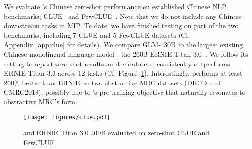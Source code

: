 We evaluate \glm's Chinese zero-shot performance on established Chinese NLP benchmarks, CLUE~\citep{xu2020clue} and FewCLUE~\citep{xu2021fewclue}.%
Note that we do not include any Chinese downstream tasks in MIP. %
To date, we have finished testing on part of the two benchmarks, including 7 CLUE and 5 FewCLUE datasets (Cf. Appendix~\ref{app:clue} for details). 
We compare GLM-130B to the largest existing Chinese monolingual language model---the 260B ERNIE Titan 3.0~\citep{wang2021ernie}. %
We follow its setting to report zero-shot results on dev datasets. 
\glm consistently outperforms ERNIE Titan 3.0 across 12 tasks (Cf. Figure~\ref{fig:clue}). 
Interestingly, \glm performs at least 260\% better than ERNIE on two abstractive MRC datasets (DRCD and CMRC2018), possibly due to \glm's pre-training objective that naturally resonates to abstractive MRC's form. 

\begin{figure}[t]
    \centering
    \texttt{[image: figures/clue.pdf]}
    \vspace{-6mm}
    \caption{\glm and ERNIE Titan 3.0 260B evaluated on zero-shot CLUE and FewCLUE.}
    \label{fig:clue}
    \vspace{-4mm}
\end{figure}

